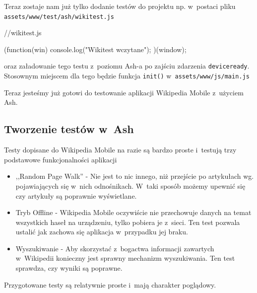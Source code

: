 \documentclass{xmgr}
\begin{document}
Teraz zostaje nam już tylko dodanie testów do projektu np. w~postaci pliku  \texttt{assets/www/test/ash/wikitest.js} 

\begin{javascriptcode}
   //wikitest.js

  (function(win){  
    console.log("Wikitest wczytane");
  })(window);
\end{javascriptcode}

\noindent oraz załadowanie tego testu z~poziomu Ash-a po zajściu zdarzenia \texttt{deviceready}. Stosownym miejscem dla tego będzie funkcja \texttt{init()} w~\texttt{assets/www/js/main.js}


\noindent Teraz jesteśmy już gotowi do testowanie aplikacji Wikipedia Mobile z~użyciem Ash.

\subsection{Tworzenie testów w~Ash}

Testy dopisane do Wikipedia Mobile na razie są bardzo proste i~testują trzy podstawowe funkcjonalności aplikacji 

\begin{itemize}
  \item ,,Random Page Walk'' - Nie jest to nic innego, niż przejście po artykułach wg. pojawiających się w~nich odnośnikach. W~taki sposób możemy upewnić się czy artykuły są poprawnie wyświetlane.
  \item Tryb Offline - Wikipedia Mobile oczywiście nie przechowuje danych na temat wszystkich haseł na urządzeniu, tylko pobiera je z~sieci. Ten test pozwala ustalić jak zachowa się aplikacja w~przypadku jej braku.
  \item Wyszukiwanie - Aby skorzystać z~bogactwa informacji zawartych w~Wikipedii konieczny jest sprawny mechanizm wyszukiwania. Ten test sprawdza, czy wyniki są poprawne.  
\end{itemize}

Przygotowane testy są relatywnie proste i~mają charakter poglądowy. 
\end{document}
